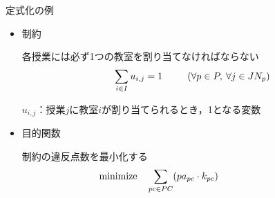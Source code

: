 \documentclass[dvipdfmx,12pt]{beamer}
\begin{document}
\begin{frame}{定式化の例}
\begin{itemize}
\item 制約 \\
\begin{block}{各授業には必ず1つの教室を割り当てなければならない}
\vspace{-15pt}
\begin{eqnarray}
&&\sum_{i \in I} u_{i,j} = 1 \hspace{5.0mm}
\quad \left (\forall p \in P, \: \forall j \in JN_{p} \right)\nonumber
\end{eqnarray} 
\end{block}
$u_{i,j}$：授業$j$に教室$i$が割り当てられるとき，1となる変数
\vspace{10pt}
\item 目的関数\\
\begin{block}{制約の違反点数を最小化する}
\vspace{-15pt}
\begin{eqnarray}
\label{hmokuteki} 
&&\hspace{-70pt}{\rm minimize} \quad \sum_{pc \in PC} (pa_{pc} \cdot k_{pc}) \label{eqn:mokuteki}\nonumber
\end{eqnarray}
\end{block}
\end{itemize}
\end{frame}
\end{document}

